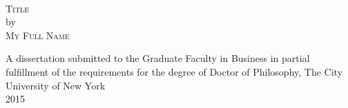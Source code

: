 \begin{titlepage}

\begin{center}

~\vspace{2in}

\textsc{Title} \\[0.5in]
by \\[0.5in]
\textsc{My Full Name} 

\vspace{\fill}
A dissertation submitted to the Graduate Faculty in Business in partial fulfillment of the requirements for the degree of Doctor of Philosophy, The City University of New York \\[0.25in]
2015

\end{center}

\end{titlepage}
